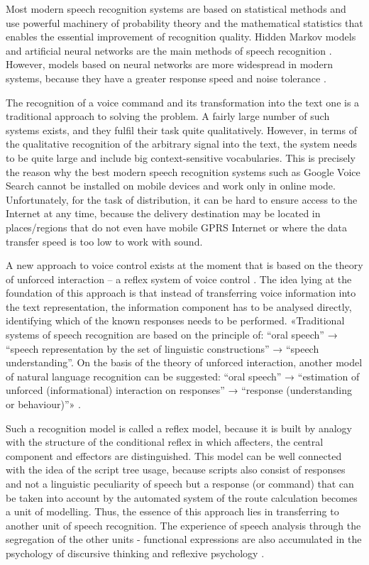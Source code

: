 Most modern speech recognition systems are based on statistical methods and use powerful machinery of probability theory and the mathematical statistics that enables the essential improvement of recognition quality. Hidden Markov models and artificial neural networks are the main methods of speech recognition \cite{Makovkin_2006, Gefke_2012}. However, models based on neural networks are more widespread in modern systems, because they have a greater response speed and noise tolerance \cite{Hinton_2012}.

The recognition of a voice command and its transformation into the text one is a traditional approach to solving the problem. A fairly large number of such systems exists, and they fulfil their task quite qualitatively. However, in terms of the qualitative recognition of the arbitrary signal into the text, the system needs to be quite large and include big context-sensitive vocabularies. This is precisely the reason why the best modern speech recognition systems such as Google Voice Search cannot be installed on mobile devices and work only in online mode. Unfortunately, for the task of distribution, it can be hard to ensure access to the Internet at any time, because the delivery destination may be located in places/regions that do not even have mobile GPRS Internet or where the data transfer speed is too low to work with sound. 

A new approach to voice control exists at the moment that is based on the theory of unforced interaction \cite{Teslia_2010} – a reflex system of voice control \cite{Egorchenkov_2016}. The idea lying at the foundation of this approach is that instead of transferring voice information into the text representation, the information component has to be analysed directly, identifying which of the known responses needs to be performed. «Traditional systems of speech recognition are based on the principle of: “oral speech” → “speech representation by the set of linguistic constructions” → “speech understanding”. On the basis of the theory of unforced interaction, another model of natural language recognition can be suggested: “oral speech” → “estimation of unforced (informational) interaction on responses” → “response (understanding or behaviour)”» \cite{Teslia_2014}. 

Such a recognition model is called a reflex model, because it is built by analogy with the structure of the conditional reflex in which affecters, the central component and effectors are distinguished. This model can be well connected with the idea of the script tree usage, because scripts also consist of responses and not a linguistic peculiarity of speech but a response (or command) that can be taken into account by the automated system of the route calculation becomes a unit of modelling. Thus, the essence of this approach lies in transferring to another unit of speech recognition. The experience of speech analysis through the segregation of the other units - functional expressions are also accumulated in the psychology of discursive thinking and reflexive psychology \cite{Naydonov_2008}. 

